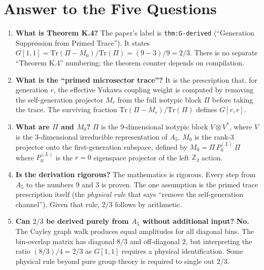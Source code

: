 \documentclass[11pt]{article}
\theoremstyle{definition}
\begin{document}
\section{Answer to the Five Questions}

\begin{enumerate}
\item \textbf{What is Theorem K.4?}
The paper's label is \texttt{thm:G-derived} (``Generation Suppression from Primed Trace'').
It states $G[1,1] = \mathrm{Tr}(\Pi - M_0)/\mathrm{Tr}(\Pi) = (9-3)/9 = 2/3$.
There is no separate ``Theorem K.4'' numbering; the theorem counter depends on compilation.

\item \textbf{What is the ``primed microsector trace''?}
It is the prescription that, for generation $r$, the effective Yukawa coupling weight
is computed by removing the self-generation projector $M_r$ from the full isotypic
block $\Pi$ before taking the trace. The surviving fraction
$\mathrm{Tr}(\Pi - M_r)/\mathrm{Tr}(\Pi)$ defines $G[r,r]$.

\item \textbf{What are $\Pi$ and $M_0$?}
$\Pi$ is the 9-dimensional isotypic block $V \otimes V^*$, where $V$ is the 3-dimensional
irreducible representation of $A_5$. $M_0$ is the rank-3 projector onto the first-generation
subspace, defined by $M_0 = \Pi\, P_0^{(L)}\, \Pi$ where $P_0^{(L)}$ is the $r=0$ eigenspace
projector of the left $\mathbb{Z}_3$ action.

\item \textbf{Is the derivation rigorous?}
The mathematics is rigorous. Every step from $A_5$ to the numbers $9$ and $3$ is proven.
The one assumption is the primed trace prescription itself (the \emph{physical rule} that
says ``remove the self-generation channel''). Given that rule, $2/3$ follows by arithmetic.

\item \textbf{Can $2/3$ be derived purely from $A_5$ without additional input?}
\textbf{No.} The Cayley graph walk produces equal amplitudes for all diagonal bins.
The bin-overlap matrix has diagonal $8/3$ and off-diagonal $2$, but interpreting
the ratio $(8/3)/4 = 2/3$ as $G[1,1]$ requires a physical identification.
Some physical rule beyond pure group theory is required to single out $2/3$.
\end{enumerate}
\end{document}
